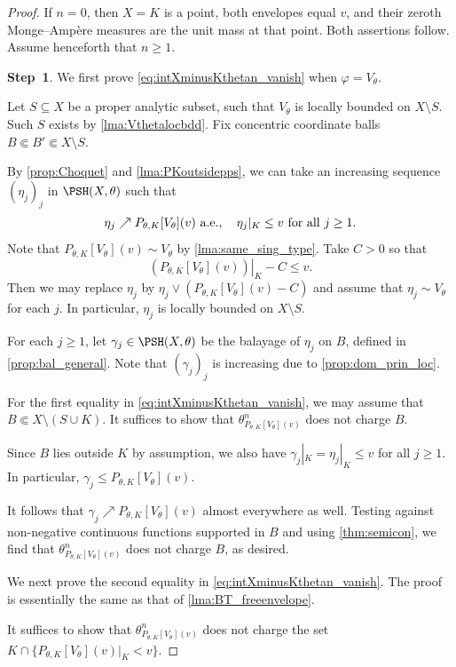 \begin{proof}
If $n=0$, then $X=K$ is a point, both envelopes equal $v$, and their zeroth Monge--Ampère measures are the unit mass at that point. Both assertions follow. Assume henceforth that $n\geq 1$.

\textbf{Step~1}. We first prove \eqref{eq:intXminusKthetan_vanish} when $\varphi = V_{\theta}$.

Let $S\subseteq X$ be a proper analytic subset, such that $V_{\theta}$ is locally bounded on $X\setminus S$. Such $S$ exists by \cref{lma:Vthetalocbdd}.
Fix concentric coordinate balls $B\Subset B'\Subset X\setminus S$.

By \cref{prop:Choquet} and \cref{lma:PKoutsidepps}, we can take an increasing sequence $(\eta_j)_j$ in $\PSH(X,\theta)$ such that
\[
\eta_j\nearrow P_{\theta,K}[V_{\theta}](v)\textup{ a.e.},\quad \eta_j|_K\leq v\textup{ for all }j\geq 1.
\]
Note that $P_{\theta,K}[V_{\theta}](v)\sim V_{\theta}$ by \cref{lma:same_sing_type}. Take $C>0$ so that
\[
\left.\left( P_{\theta,K}[V_{\theta}](v) \right)\right|_K-C\leq v.
\]
Then we may replace $\eta_j$ by $\eta_j\lor (P_{\theta,K}[V_{\theta}](v)-C)$ and assume that $\eta_j\sim V_{\theta}$ for each $j$. In particular, $\eta_j$ is locally bounded on $X\setminus S$.

For each $j\geq 1$, let $\gamma_j\in \PSH(X,\theta)$ be the balayage of $\eta_j$ on $B$, defined in \cref{prop:bal_general}. Note that $(\gamma_j)_j$ is increasing due to \cref{prop:dom_prin_loc}.

For the first equality in \eqref{eq:intXminusKthetan_vanish},
we may assume that $B\Subset X\setminus (S \cup K)$. It suffices to show that $\theta_{P_{\theta,K}[V_{\theta}](v)}^n$ does not charge $B$.

Since $B$ lies outside $K$ by assumption, we also have $\gamma_j|_K=\eta_j|_K \leq v$ for all $j\geq 1$. In particular, $\gamma_j\leq P_{\theta,K}[V_{\theta}](v)$.

It follows that $\gamma_j \nearrow P_{\theta,K}[V_{\theta}](v)$ almost everywhere as well. Testing against non-negative continuous functions supported in $B$ and using \cref{thm:semicon}, we find that $\theta^n_{P_{\theta,K}[V_{\theta}](v)}$ does not charge $B$, as desired.

We next prove the second equality in \eqref{eq:intXminusKthetan_vanish}. The proof is essentially the same as that of \cref{lma:BT_freeenvelope}.

It suffices to show that $\theta^n_{P_{\theta,K}[V_{\theta}](v)}$ does not charge the set $K\cap \{P_{\theta,K}[V_{\theta}](v)|_K<v\}$.



\end{proof}
